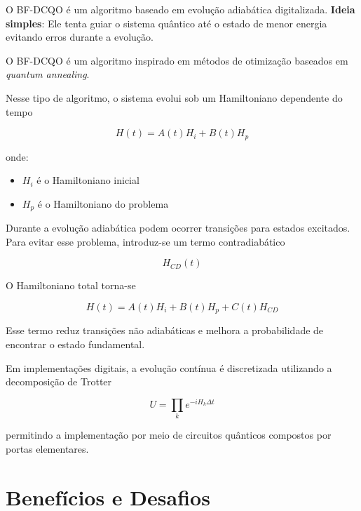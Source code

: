 \documentclass[a4paper,12pt]{article}
\begin{document}
\begin{tcolorbox}[colback=red!10,colframe=black!70!black,title=BF-DCQO]
O BF-DCQO é um algoritmo baseado em evolução adiabática digitalizada.
\textbf{Ideia simples}: Ele tenta guiar o sistema quântico até o estado de menor 
energia evitando erros durante a evolução.
\end{tcolorbox}

O BF-DCQO é um algoritmo inspirado em métodos de otimização baseados em 
\textit{quantum annealing}.

Nesse tipo de algoritmo, o sistema evolui sob um \colorbox{yellow!20}{Hamiltoniano dependente do tempo}

\begin{equation}
H(t)=A(t)H_i + B(t)H_p
\end{equation}

onde:

\begin{itemize}
\item $H_i$ é o Hamiltoniano inicial
\item $H_p$ é o Hamiltoniano do problema
\end{itemize}

Durante a evolução adiabática podem ocorrer transições para estados excitados. 
Para evitar esse problema, introduz-se um termo contradiabático

\begin{equation}
H_{CD}(t)
\end{equation}

O Hamiltoniano total torna-se

\begin{equation}
H(t)=A(t)H_i + B(t)H_p + C(t)H_{CD}
\end{equation}

Esse termo reduz transições não adiabáticas e melhora a probabilidade de encontrar 
o estado fundamental.

Em implementações digitais, a evolução contínua é discretizada utilizando a 
decomposição de Trotter

\begin{equation}
U = \prod_k e^{-iH_k \Delta t}
\end{equation}

permitindo a implementação por meio de circuitos quânticos compostos por portas elementares.

\section{Benefícios e Desafios}
\end{document}
